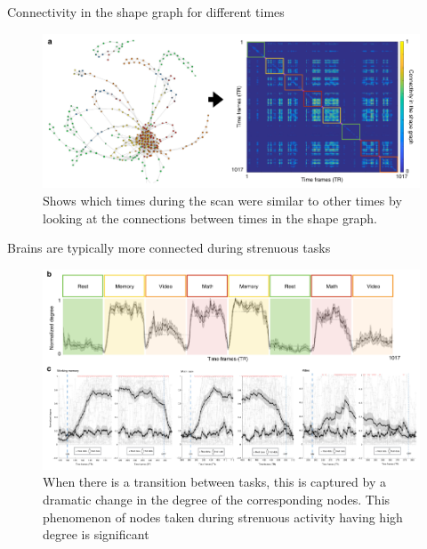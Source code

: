 \documentclass{beamer}
\begin{document}

\begin{frame}{Connectivity in the shape graph for different times}
    \begin{figure}
        \includegraphics[width = 0.95\linewidth]{fig5a.png}
        \caption{Shows which times during the scan were similar to other times by looking at the connections between times in the shape graph.}
    \end{figure}
\end{frame}

\begin{frame}{Brains are typically more connected during strenuous tasks}
    \begin{figure}
        \includegraphics[width = 0.85\linewidth]{fig5b.png}
        \caption{When there is a transition between tasks, this is captured by a dramatic change in the degree of the corresponding nodes. This phenomenon of nodes taken during strenuous activity having high degree is significant}
    \end{figure}
\end{frame}
\end{document}
